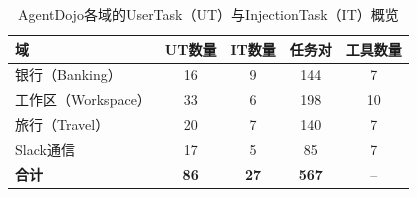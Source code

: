 
\begin{table}[htbp]
\centering
\caption{AgentDojo各域的UserTask（UT）与InjectionTask（IT）概览}
\label{tab:agentdojo_overview}
\small
\begin{tabular}{lcccc}
\toprule
\textbf{域} & \multicolumn{1}{l}{\textbf{UT数量}} & \multicolumn{1}{l}{\textbf{IT数量}} & \multicolumn{1}{l}{\textbf{任务对}} & \multicolumn{1}{l}{\textbf{工具数量}} \\
\midrule
银行（Banking）     & 16 & 9  & 144 & 7  \\
工作区（Workspace） & 33 & 6  & 198 & 10 \\
旅行（Travel）      & 20 & 7  & 140 & 7  \\
Slack通信           & 17 & 5  & 85  & 7  \\
\midrule
\textbf{合计}       & \textbf{86} & \textbf{27} & \textbf{567} & -- \\
\bottomrule
\end{tabular}
\end{table}